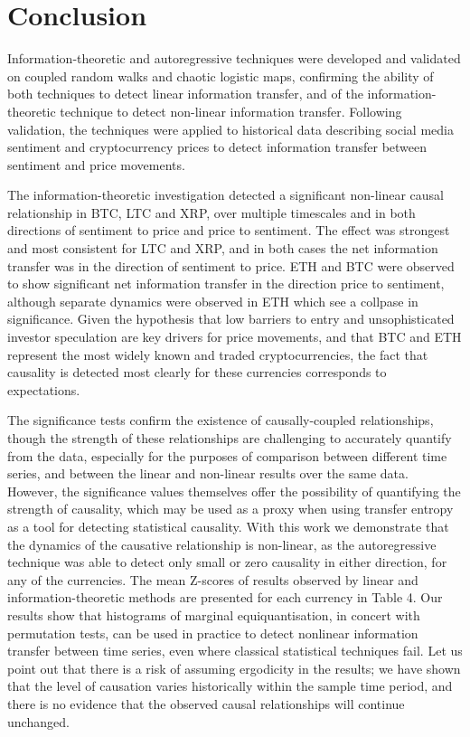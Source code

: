\documentclass[]{rsos}%
\begin{document}
 
\clearpage
\section{Conclusion} \label{s.conclusions}

Information-theoretic and autoregressive techniques were developed and validated on coupled random walks and chaotic logistic maps, confirming the ability of both techniques to detect linear information transfer, and of the information-theoretic technique to detect non-linear information transfer. Following validation, the techniques were applied to historical data describing social media sentiment and cryptocurrency prices to detect information transfer between sentiment and price movements. 

The information-theoretic investigation detected a significant non-linear causal relationship in BTC, LTC and XRP, over multiple timescales and in both directions of sentiment to price and price to sentiment. The effect was strongest and most consistent for LTC and XRP, and in both cases the net information transfer was in the direction of sentiment to price. ETH and BTC were observed to show significant net information transfer in the direction price to sentiment, although separate dynamics were observed in ETH which see a collpase in significance. Given the hypothesis that low barriers to entry and unsophisticated investor speculation are key drivers for price movements, and that BTC and ETH represent the most widely known and traded cryptocurrencies, the fact that causality is detected most clearly for these currencies corresponds to expectations.

The significance tests confirm the existence of causally-coupled relationships, though the strength of these relationships are challenging to accurately quantify from the data, especially for the purposes of comparison between different time series, and between the linear and non-linear results over the same data. However, the significance values themselves offer the possibility of quantifying the strength of causality, which may be used as a proxy when using transfer entropy as a tool for detecting statistical causality. With this work we demonstrate that the dynamics of the causative relationship is non-linear, as the autoregressive technique was able to detect only small or zero causality in either direction, for any of the currencies. The mean Z-scores of results observed by linear and information-theoretic methods are presented for each currency in Table {\color{blue}4}. Our results show that histograms of marginal equiquantisation, in concert with permutation tests, can be used in practice to detect nonlinear information transfer between time series, even where classical statistical techniques fail. Let us point out that there is a risk of assuming ergodicity in the results; we have shown that the level of causation varies historically within the sample time period, and there is no evidence that the observed causal relationships will continue unchanged. 
\end{document}
